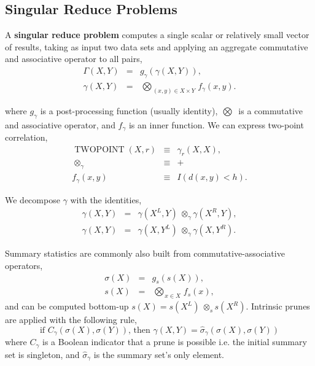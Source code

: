 \documentclass[times, leqno,twocolumn]{article}
\newcommand{\summary}{\hat{\sigma}}
\DeclareMathOperator{\TWOPT}{TWOPOINT}
\newcommand{\defterm}[1]{{\bf #1}}
\newcommand{\kdleft}[1]{#1^{\!L}}
\newcommand{\kdright}[1]{#1^{\!R}}
\newcommand{\nameOp}[2]{\mathop{#1\nolimits\!\!_{#2}}}
\newcommand{\nameop}[2]{{\scriptstyle\:}#1_{\!#2}}
\newcommand{\myOp}[1]{\nameOp{\bigotimes}{#1}}
\newcommand{\myop}[1]{\nameop{\otimes}{#1}}
\newcommand{\letterglob}{\gamma}
\newcommand{\outglob}{\Gamma}
\newcommand{\inglob}{\gamma}
\newcommand{\Opglob}{\myOp{\letterglob}}
\newcommand{\opglob}{\myop{\letterglob}}
\newcommand{\fglob}{f_{\!\letterglob}}
\newcommand{\gglob}{g_{\!\letterglob}}
\newcommand{\canpruneglob}{C_{\!\letterglob}}
\newcommand{\deltaglob}{\summary_{\!\letterglob}}
\newcommand{\letterstat}{s}
\newcommand{\outstat}{\sigma}
\newcommand{\instat}{s}
\newcommand{\Opstat}{\myOp{\letterstat}}
\newcommand{\opstat}{\myop{\letterstat}}
\newcommand{\fstat}{f_{\!\letterstat}}
\newcommand{\gstat}{g_{\!\letterstat}}
\begin{document}

\subsection{Singular Reduce Problems}

A \defterm{singular reduce problem} computes a single scalar or relatively small vector of results, taking as input two data sets and applying an aggregate commutative and associative operator to all pairs,
\begin{eqnarray*}
\outglob(X, Y) &=& \gglob(\inglob(X, Y)),
\\
\inglob(X, Y) &=& \Opglob_{(x, y) \in X \times Y} \fglob(x, y).
\label{eqn:defglob}
\end{eqnarray*}

\noindent where $\gglob$ is a post-processing function (usually identity), $\Opglob$ is a commutative and associative operator, and $\fglob$ is an inner function.
We can express two-point correlation,
\[\begin{array}{rcl}
\TWOPT(X, r) &\equiv& \inglob_r(X, X),
\\
\opglob &\equiv& +
\\
\fglob(x, y) &\equiv& I(d(x, y) < h).
\end{array}\]

\noindent We decompose $\inglob$ with the identities,
\begin{eqnarray*}
\inglob(X, Y) &=& \inglob(\kdleft{X}, Y) \opglob \inglob(\kdright{X}, Y),
\\
\inglob(X, Y) &=& \inglob(X, \kdleft{Y}) \opglob \inglob(X, \kdright{Y}).
\label{eqn:divideglob}
\end{eqnarray*}

\noindent Summary statistics are commonly also built from commutative-associative operators,
\begin{eqnarray*}
\outstat(X) &=& \gstat(\instat(X)),
\\
\instat(X) &=& \Opstat_{x \in X} \fstat(x),
\label{eqn:defstat}
\end{eqnarray*}
\noindent and can be computed bottom-up $\instat(X) = \instat(\kdleft{X}) \opstat \instat(\kdright{X})$.
Intrinsic prunes are applied with the following rule,
\begin{equation*}
\text{if } \canpruneglob(\outstat(X), \outstat(Y)) \text{, then } \inglob(X, Y) = \deltaglob(\outstat(X), \outstat(Y))
\label{eqn:intrinsic}
\end{equation*}
\noindent where $\canpruneglob$ is a Boolean indicator that a prune is possible i.e. the initial summary set is singleton, and $\deltaglob$ is the summary set's only element.
\end{document}
